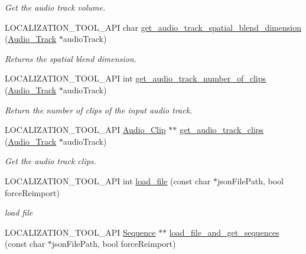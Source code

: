 \begin{DoxyCompactItemize}
\begin{DoxyCompactList}\small\item\em Get the audio track volume. \end{DoxyCompactList}\item 
L\+O\+C\+A\+L\+I\+Z\+A\+T\+I\+O\+N\+\_\+\+T\+O\+O\+L\+\_\+\+A\+PI char \mbox{\hyperlink{namespaceprz_a4fb782ac49bc3d6a8d5ef62f0d529b29}{get\+\_\+audio\+\_\+track\+\_\+spatial\+\_\+blend\+\_\+dimension}} (\mbox{\hyperlink{classprz_1_1_audio___track}{Audio\+\_\+\+Track}} $\ast$audio\+Track)
\begin{DoxyCompactList}\small\item\em Returns the spatial blend dimension. \end{DoxyCompactList}\item 
L\+O\+C\+A\+L\+I\+Z\+A\+T\+I\+O\+N\+\_\+\+T\+O\+O\+L\+\_\+\+A\+PI int \mbox{\hyperlink{namespaceprz_a8f5ec57a63ae029d8417d533e30965f4}{get\+\_\+audio\+\_\+track\+\_\+number\+\_\+of\+\_\+clips}} (\mbox{\hyperlink{classprz_1_1_audio___track}{Audio\+\_\+\+Track}} $\ast$audio\+Track)
\begin{DoxyCompactList}\small\item\em Return the number of clips of the input audio track. \end{DoxyCompactList}\item 
L\+O\+C\+A\+L\+I\+Z\+A\+T\+I\+O\+N\+\_\+\+T\+O\+O\+L\+\_\+\+A\+PI \mbox{\hyperlink{classprz_1_1_audio___clip}{Audio\+\_\+\+Clip}} $\ast$$\ast$ \mbox{\hyperlink{namespaceprz_a291fc379c9ff52af1a7aaa0ac7736567}{get\+\_\+audio\+\_\+track\+\_\+clips}} (\mbox{\hyperlink{classprz_1_1_audio___track}{Audio\+\_\+\+Track}} $\ast$audio\+Track)
\begin{DoxyCompactList}\small\item\em Get the audio track clips. \end{DoxyCompactList}\item 
L\+O\+C\+A\+L\+I\+Z\+A\+T\+I\+O\+N\+\_\+\+T\+O\+O\+L\+\_\+\+A\+PI int \mbox{\hyperlink{namespaceprz_a53f06f7dabea7f0219ac751039a82e3c}{load\+\_\+file}} (const char $\ast$json\+File\+Path, bool force\+Reimport)
\begin{DoxyCompactList}\small\item\em load file \end{DoxyCompactList}\item 
L\+O\+C\+A\+L\+I\+Z\+A\+T\+I\+O\+N\+\_\+\+T\+O\+O\+L\+\_\+\+A\+PI \mbox{\hyperlink{classprz_1_1_sequence}{Sequence}} $\ast$$\ast$ \mbox{\hyperlink{namespaceprz_ad91b0a2618b7c9ce3a9bf792a3979e55}{load\+\_\+file\+\_\+and\+\_\+get\+\_\+sequences}} (const char $\ast$json\+File\+Path, bool force\+Reimport)

\end{DoxyCompactItemize}

